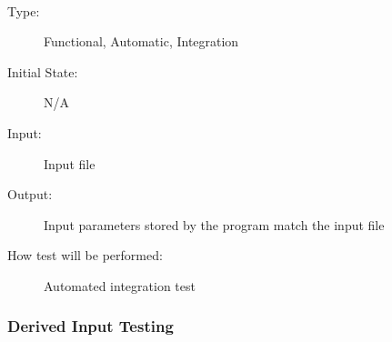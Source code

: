 \documentclass[12pt, titlepage]{article}
\newcounter{testnum} %
\begin{document}
\\
\begin{addmargin}[2em]{0em}
\begin{description}
\item[Type:] Functional, Automatic, Integration
					
\item[Initial State:] N/A
					
\item[Input:] Input file\\

\item[Output:] Input parameters stored by the program match the input file\\
					
\item[How test will be performed:] Automated integration test\\
\end{description}
\end{addmargin}		


\subsubsection{Derived Input Testing}
\end{document}

